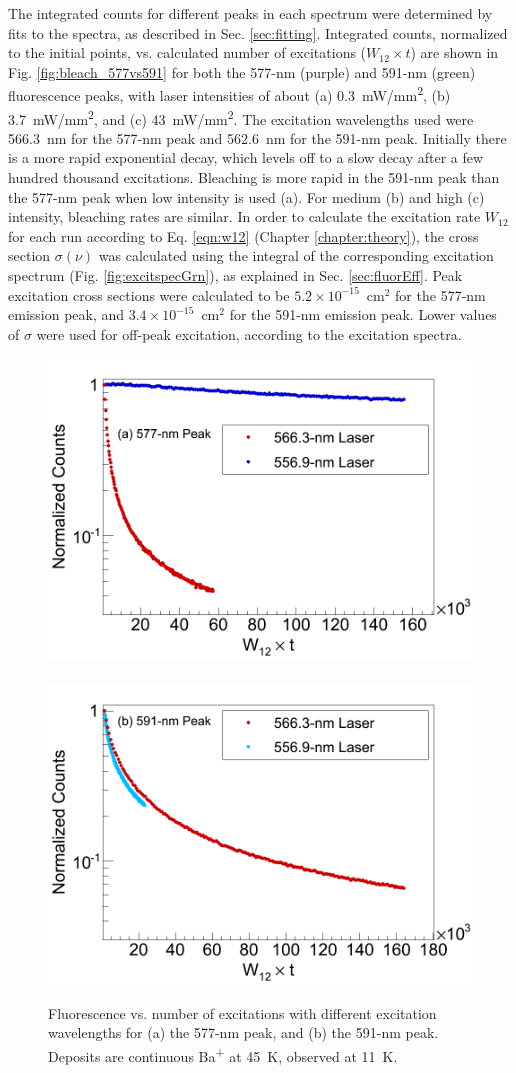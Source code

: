 The integrated counts for different peaks in each spectrum were determined by fits to the spectra, as described in Sec. \ref{sec:fitting}.  Integrated counts, normalized to the initial points, vs. calculated number of excitations ($W_{12} \times t$) are shown in Fig. \ref{fig:bleach_577vs591} for both the 577-nm (purple) and 591-nm (green) fluorescence peaks, with laser intensities of about (a) 0.3~mW/mm\textsuperscript{2}, (b) 3.7~mW/mm\textsuperscript{2}, and (c) 43~mW/mm\textsuperscript{2}.  The excitation wavelengths used were 566.3~nm for the 577-nm peak and 562.6~nm for the 591-nm peak.  Initially there is a more rapid exponential decay, which levels off to a slow decay after a few hundred thousand excitations.  Bleaching is more rapid in the 591-nm peak than the 577-nm peak when low intensity is used (a).  For medium (b) and high (c) intensity, bleaching rates are similar.  In order to calculate the excitation rate $W_{12}$ for each run according to Eq. \ref{eqn:w12} (Chapter \ref{chapter:theory}), the cross section $\sigma(\nu)$ was calculated using the integral of the corresponding excitation spectrum (Fig. \ref{fig:excitspecGrn}), as explained in Sec. \ref{sec:fluorEff}.  Peak excitation cross sections were calculated to be $5.2 \times 10^{-15}$~cm$^{2}$ for the 577-nm emission peak, and $3.4 \times 10^{-15}$~cm$^{2}$ for the 591-nm emission peak.  Lower values of $\sigma$ were used for off-peak excitation, according to the excitation spectra.

\begin{figure} %
        \centering
                \includegraphics[width=.5\textwidth]{figures/bleach_compareExcitations_specificSigmas_a.png}
                ~
                \includegraphics[width=.5\textwidth]{figures/bleach_compareExcitations_specificSigmas_b.png}
                \caption{Fluorescence vs. number of excitations with different excitation wavelengths for (a) the 577-nm peak, and (b) the 591-nm peak.  Deposits are continuous Ba\textsuperscript{+} at 45~K, observed at 11~K.}
\label{fig:bleach_excitCompare}
\end{figure}

